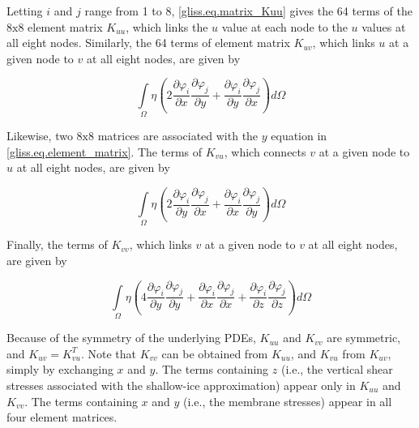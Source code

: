 \noindent
Letting $i$ and $j$ range from 1 to 8, \eqref{gliss.eq.matrix_Kuu} gives the 64 terms of the $8\text{x}8$ element matrix $K_{uu}$,
which links the $u$ value at each node to the $u$ values at all eight nodes.
Similarly, the 64 terms of element matrix $K_{uv}$, which links $u$ at a given node to $v$ at all eight nodes,
are given by

\begin{equation}
  \label{gliss.eq.matrix_Kuv}
  \int\limits_{\Omega }{\eta \left( 2\frac{\partial {{\varphi }_{i}}}{\partial x}\frac{\partial {{\varphi }_{j}}}{\partial y}+\frac{\partial {{\varphi }_{i}}}{\partial y}\frac{\partial {{\varphi }_{j}}}{\partial x} \right)}d\Omega
\end{equation}

Likewise, two $8\text{x}8$ matrices are associated with the $y$ equation in \eqref{gliss.eq.element_matrix}.  
The terms of $K_{vu}$, which connects $v$ at a given node to $u$ at all eight nodes, are given by

\begin{equation}
  \label{gliss.eq.matrix_Kvu}
  \int\limits_{\Omega }{\eta \left( 2\frac{\partial {{\varphi }_{i}}}{\partial y}\frac{\partial {{\varphi }_{j}}}{\partial x}+\frac{\partial {{\varphi }_{i}}}{\partial x}\frac{\partial {{\varphi }_{j}}}{\partial y} \right)}d\Omega
\end{equation}

\noindent
Finally, the terms of $K_{vv}$, which links $v$ at a given node to $v$ at all eight nodes, are given by

\begin{equation}
  \label{gliss.eq.matrix_Kvv}
  \int\limits_{\Omega }{\eta \left( 4\frac{\partial {{\varphi }_{i}}}{\partial y}\frac{\partial {{\varphi }_{j}}}{\partial y}+\frac{\partial {{\varphi }_{i}}}{\partial x}\frac{\partial {{\varphi}_{j}}}{\partial x}+\frac{\partial {{\varphi }_{i}}}{\partial z}\frac{\partial {{\varphi }_{j}}}{\partial z} \right)}d\Omega
\end{equation}

Because of the symmetry of the underlying PDEs, $K_{uu}$ and $K_{vv}$ are symmetric,
and $K_{uv} = K_{vu}^{T}$.  Note that $K_{vv}$ can be obtained from $K_{uu}$, and
$K_{vu}$ from $K_{uv}$, simply by exchanging $x$ and $y$.  The terms
containing $z$ (i.e., the vertical shear stresses associated with the shallow-ice approximation)
appear only in $K_{uu}$ and $K_{vv}$.  The terms containing $x$ and $y$ (i.e.,
the membrane stresses) appear in all four element matrices.

